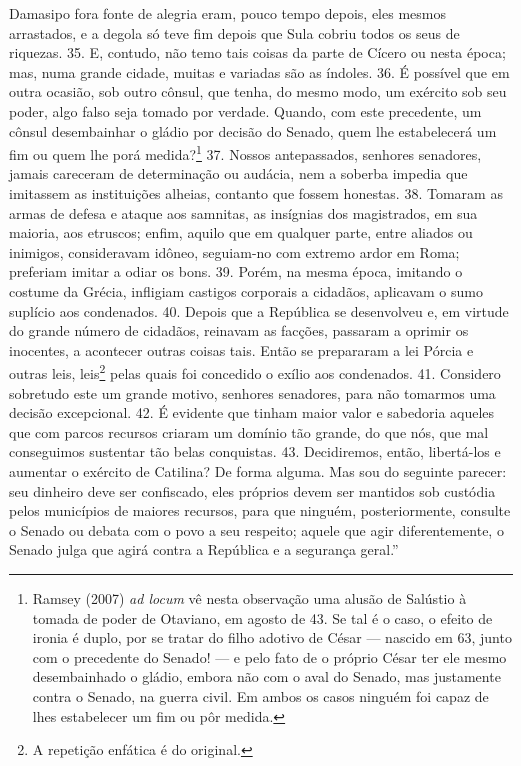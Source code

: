 Damasipo fora fonte de alegria eram, pouco tempo depois, eles mesmos
arrastados, e a degola só teve fim depois que Sula cobriu todos os seus de
riquezas. 35. E, contudo, não temo tais coisas da parte de  Cícero ou nesta
época; mas, numa grande cidade, muitas e variadas são as índoles. 36. É
possível que em outra ocasião, sob outro cônsul, que tenha, do mesmo modo, um
exército sob seu poder, algo falso seja tomado por verdade. Quando, com
este precedente, um cônsul desembainhar o gládio por decisão do Senado, quem
lhe estabelecerá um fim ou quem lhe porá medida?\footnote{Ramsey (2007)
\emph{ad locum} vê nesta observação uma alusão de Salústio à tomada de poder de
Otaviano, em agosto de 43. Se tal é o caso, o efeito de ironia é duplo, por se
tratar do filho adotivo de César --- nascido em 63, junto com o precedente do
Senado! --- e pelo fato de o próprio César ter ele mesmo desembainhado o
gládio, embora não com o aval do Senado, mas justamente contra o Senado, na guerra civil. Em
ambos os casos ninguém foi capaz de lhes estabelecer um fim ou pôr medida.} 37.
Nossos antepassados, senhores senadores, jamais careceram de determinação ou
audácia, nem a soberba impedia que imitassem as instituições alheias, contanto
que fossem honestas. 38. Tomaram as armas de defesa e ataque aos samnitas, as
insígnias dos magistrados, em sua maioria, aos etruscos; enfim, aquilo que em
qualquer parte, entre aliados ou inimigos, consideravam idôneo, seguiam-no com
extremo ardor em Roma; preferiam imitar a odiar os bons. 39. Porém, na mesma
época, imitando o costume da Grécia, infligiam castigos corporais a cidadãos,
aplicavam o sumo suplício aos condenados. 40. Depois que a República se
desenvolveu e, em virtude do grande número de cidadãos, reinavam as facções,
passaram a oprimir os inocentes, a acontecer outras coisas tais. Então se
prepararam a lei Pórcia e outras leis, leis\footnote{A repetição enfática é do original.}
pelas quais foi concedido o exílio aos condenados. 41. Considero sobretudo este
um grande motivo, senhores senadores, para não tomarmos uma decisão
excepcional. 42. É evidente que tinham maior valor e sabedoria aqueles que com
parcos recursos criaram um domínio tão grande, do que nós, que mal conseguimos
sustentar tão belas conquistas. 43. Decidiremos, então, libertá-los e aumentar
o exército de Catilina? De forma alguma. Mas sou do seguinte parecer: seu
dinheiro deve ser confiscado, eles próprios devem ser mantidos sob custódia
pelos municípios de maiores recursos, para que ninguém, posteriormente,
consulte o Senado ou debata com o povo a seu respeito; aquele que agir
diferentemente, o Senado julga que agirá contra a República e a segurança
geral.''


